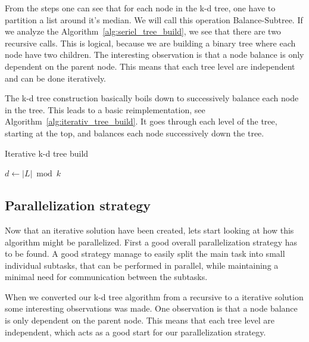 From the steps one can see that for each node in the k-d tree, one have to partition a list around it's median. We will call this operation Balance-Subtree. If we analyze the Algorithm~\ref{alg:seriel_tree_build}, we see that there are two recursive calls. This is logical, because we are building a binary tree where each node have two children. The interesting observation is that a node balance is only dependent on the parent node. This means that each tree level are independent and can be done iteratively.

The k-d tree construction basically boils down to successively balance each node in the tree. This leads to a basic reimplementation, see Algorithm~\ref{alg:iterativ_tree_build}. It goes through each level of the tree, starting at the top, and balances each node successively down the tree.

\begin{algorithm}
\caption{Iterative k-d tree build}
\label{alg:iterativ_tree_build}
\begin{algorithmic}
                \State$d \gets |L| \bmod k$ 
                \State {}
            \EndFor
        \EndFor
    \EndFunction
\end{algorithmic}
\end{algorithm}

\subsection{Parallelization strategy} %
\label{ssub:parallelization_strategy}

Now that an iterative solution have been created, lets start looking at how this algorithm might be parallelized. First a good overall parallelization strategy has to be found. A good strategy manage to easily split the main task into small individual subtasks, that can be performed in parallel, while maintaining a minimal need for communication between the subtasks.

When we converted our k-d tree algorithm from a recursive to a iterative solution some interesting observations was made. One observation is that a node balance is only dependent on the parent node. This means that each tree level are independent, which acts as a good start for our parallelization strategy.

